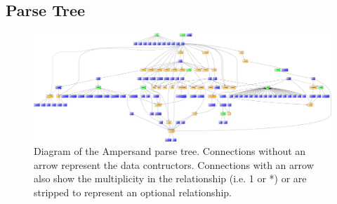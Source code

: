 \begin{landscape}

  \section*{Parse Tree}
  \label{app:parse-tree}
  \begin{figure}[htb!]
    \centering
    \includegraphics[width=25.4cm]{Figures/GenParseTree}
    \caption[Diagram of the Ampersand parse tree]{
      Diagram of the Ampersand parse tree. \small
      Connections without an arrow represent the data contructors.
      Connections with an arrow also show the multiplicity in the relationship (i.e. 1 or *) or are stripped to represent an optional relationship.
      }
    \label{fig:parse-tree}
  \end{figure}

\end{landscape}